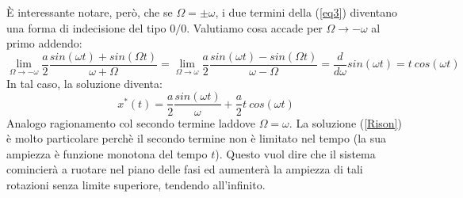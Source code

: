 \documentclass[a4paper,openany]{article}
\begin{document}
	È interessante notare, però, che se $\Omega = \pm \omega$, i due termini della (\ref{eq3}) diventano una forma di indecisione del tipo $0/0$. Valutiamo cosa accade per $\Omega\to-\omega$ al primo addendo:
	$$
	\lim_{\Omega \to -\omega} \dfrac{a}{2} \dfrac{sin(\omega t)+sin(\Omega t)}{\omega + \Omega} = \lim_{\Omega \to \omega} \dfrac{a}{2} \dfrac{sin(\omega t)-sin(\Omega t)}{\omega - \Omega} = \dfrac{d}{d\omega}sin(\omega t) = t\>cos(\omega t)
	$$
	In tal caso, la soluzione diventa:
	\begin{equation}
		x^{*}(t) = \dfrac{a}{2} \dfrac{sin(\omega t)}{\omega} + \dfrac{a}{2}t\> cos(\omega t)
		\label{Rison}
	\end{equation}
	Analogo ragionamento col secondo termine laddove $\Omega = \omega$. La soluzione (\ref{Rison}) è molto particolare perchè il secondo termine non è limitato nel tempo (la sua ampiezza è funzione monotona del tempo $t$). Questo vuol dire che il sistema comincierà a ruotare nel piano delle fasi ed aumenterà la ampiezza di tali rotazioni senza limite superiore, tendendo all'infinito.
\end{document}
